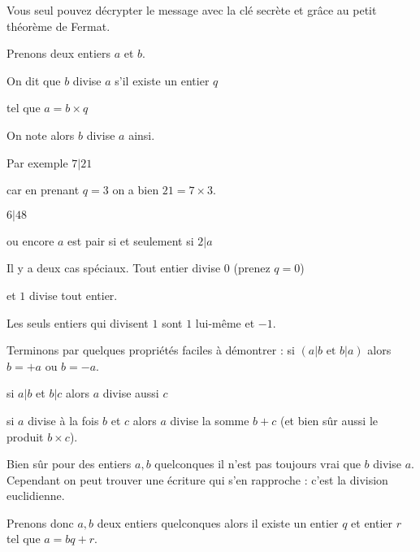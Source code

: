 \change

Vous seul pouvez décrypter le message avec la clé secrète et grâce au petit théorème de Fermat.



\diapo


Prenons deux entiers $a$ et $b$.

On dit que $b$ divise $a$ s'il existe un entier $q$

tel que $a = b \times q$

\change

On note alors $b$ divise $a$ ainsi.

\change

Par exemple  $7 | 21$ 

car en prenant $q=3$ on a bien $21 = 7 \times 3$.

\change

$6 | 48$  

\change

ou encore $a$ est pair si et seulement si $2|a$

\change

Il y a deux cas spéciaux. Tout entier  divise $0$ (prenez $q=0$)

\change 

et $1$ divise tout entier.

\change

Les seuls entiers qui divisent $1$ sont $1$ lui-même et $-1$.

\change

Terminons par quelques propriétés faciles à démontrer :
si $(a|b \text{ et } b|a)$ alors $b= +a$ ou $b=-a$.

\change

 si $a|b$  et  $b|c$ alors $a$ divise aussi $c$ 

\change

si $a$ divise à la fois $b$ et $c$ alors $a$ divise la somme $b+c$
(et bien sûr aussi le produit $b\times c$).


\diapo

Bien sûr pour des entiers $a,b$ quelconques il n'est pas toujours vrai que $b$ divise $a$.
Cependant on peut trouver une écriture qui s'en rapproche : c'est la division euclidienne.

Prenons donc $a,b$ deux entiers quelconques alors il existe un entier $q$ et entier $r$
tel que $a=bq+r$. 

\change

